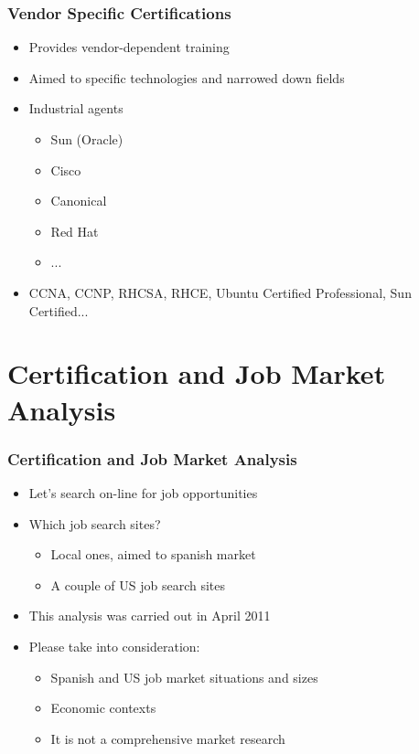 \documentclass{beamer}
\begin{document}

\begin{frame}
\frametitle{Vendor Specific Certifications}
\begin{itemize}
\item Provides vendor-dependent training
\item Aimed to specific technologies and narrowed down fields
\item Industrial agents
\begin{itemize}
    \item Sun (Oracle) 
    \item Cisco 
    \item Canonical 
    \item Red Hat
    \item ...
\end{itemize}
\item CCNA, CCNP, RHCSA, RHCE, Ubuntu Certified Professional, Sun Certified...
\end{itemize}
\end{frame}



\section{Certification and Job Market Analysis}


\begin{frame}
\frametitle{Certification and Job Market Analysis}
\begin{itemize}
\item Let's search on-line for job opportunities

\item Which job search sites? 
  \begin{itemize}
  \item Local ones, aimed to spanish market
  \item A couple of US job search sites
  \end{itemize}

\item This analysis was carried out in April 2011

\item Please take into consideration: 
  \begin{itemize}
  \item Spanish and US job market situations and sizes
  \item Economic contexts
  \item It is not a comprehensive market research
  \end{itemize}

\end{itemize}
\end{frame}
\end{document}
